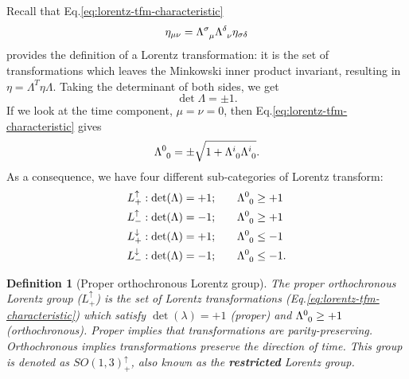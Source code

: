 \documentclass[11pt]{article}
\numberwithin{equation}{section}
\newtheorem{defn}{Definition}[section]
\begin{document}
Recall that Eq.\eqref{eq:lorentz-tfm-characteristic}
\begin{equation*}
\eta_{\mu \nu} = \tensor{\Lambda}{^\sigma_\mu} \tensor{\Lambda}{^\delta_\nu} \eta_{\sigma \delta}
\end{equation*}
provides the definition of a Lorentz transformation: it is the set of transformations which leaves the Minkowski inner product invariant, resulting in $\eta = \Lambda^T \eta \Lambda$. Taking the determinant of both sides, we get
\begin{equation}
\det{\Lambda} = \pm 1.
\end{equation}
If we look at the time component, $\mu = \nu = 0$, then Eq.\eqref{eq:lorentz-tfm-characteristic} gives
\begin{equation}
\tensor{\Lambda}{^0_0} = \pm \sqrt{1 + \tensor{\Lambda}{^i_0} \tensor{\Lambda}{^i_0}}.
\end{equation}
As a consequence, we have four different sub-categories of Lorentz transform:
\begin{align}
L_+^\uparrow: \det(\Lambda)=+1;&\qquad \tensor{\Lambda}{^0_0} \geq +1 \nonumber \\
L_-^\uparrow: \det(\Lambda)=-1;&\qquad \tensor{\Lambda}{^0_0} \geq +1 \nonumber \\
L_+^\downarrow: \det(\Lambda)=+1;&\qquad \tensor{\Lambda}{^0_0} \leq -1 \nonumber \\
L_-^\downarrow: \det(\Lambda)=-1;&\qquad \tensor{\Lambda}{^0_0} \leq -1 \nonumber. 
\end{align}

\begin{defn}[Proper orthochronous Lorentz group]
The proper orthochronous Lorentz group ($L_+^\uparrow$) is the set of Lorentz transformations (Eq.\eqref{eq:lorentz-tfm-characteristic}) which satisfy $\det(\lambda)=+1$ (proper) and $\tensor{\Lambda}{^0_0} \geq +1$ (orthochronous). Proper implies that transformations are parity-preserving. Orthochronous implies transformations preserve the direction of time. This group is denoted as $SO(1,3)^\uparrow_+$, also known as the \textbf{restricted} Lorentz group.
\end{defn}
\end{document}
